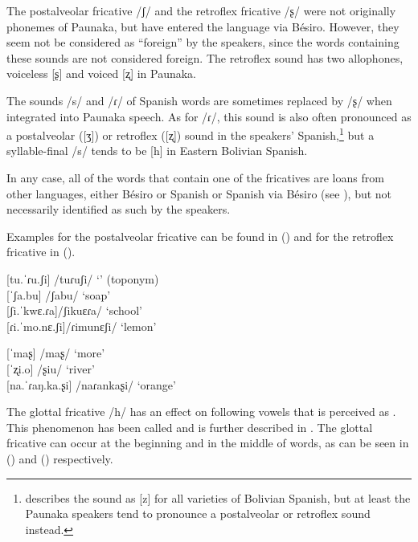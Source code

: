 The  postalveolar fricative /ʃ/ and the retroflex fricative /ʂ/ were not originally phonemes of Paunaka, but have entered the language via Bésiro. However, they seem not be considered as “foreign” by the speakers, since the words containing these sounds are not considered foreign. The retroflex sound has two allophones, voiceless [ʂ] and voiced [ʐ] in Paunaka.

The sounds /s/ and /ɾ/ of Spanish words are sometimes replaced by /ʂ/ when integrated into Paunaka speech. As for /ɾ/, this sound is also often pronounced as a postalveolar ([ʒ]) or retroflex ([ʐ]) sound in the speakers’ Spanish,\footnote{\citet[32]{Mendoza2015} describes the sound as [z] for all varieties of Bolivian Spanish, but at least the Paunaka speakers tend to pronounce a postalveolar or retroflex sound instead.} but a syllable-final /s/ tends to be [h] in Eastern Bolivian Spanish. 

In any case, all of the words that contain one of the fricatives are loans from other languages, either Bésiro or Spanish or Spanish via Bésiro (see ), but not necessarily identified as such by the speakers.

Examples for the postalveolar fricative can be found in () and for the retroflex fricative in ().

\ea\label{ex:xh}%
    [tu.ˈɾu.ʃi] \tab  /tuɾuʃi/ \tab  ‘’ (toponym)\\
    {[}ˈʃa.bu] \tab  /ʃabu/ \tab  ‘soap’ \\
     {[}ʃi.ˈkwɛ.ɾa]\tab  /ʃikuɛɾa/ \tab  ‘school’ \\
     {[}ɾi.ˈmo.nɛ.ʃi]\tab  /ɾimunɛʃi/ \tab  ‘lemon’ \\
 \xe
 
 \ea\label{ex:x}%
    [ˈmaʂ] \tab\tab  /maʂ/ \tab\tab  ‘more’ \\
    {[}ˈʐi.o] \tab\tab\tab  /ʂiu/ \tab\tab  ‘river’  \\
     {[}na.ˈɾaŋ.ka.ʂi] \tab  /naɾankaʂi/ \tab  ‘orange’ \\%
 \xe
 


The glottal fricative /h/ has an effect on following vowels that is perceived as . This phenomenon has been called  and is further described in . The glottal fricative can occur at the beginning and in the middle of words, as can be seen in () and () respectively.


